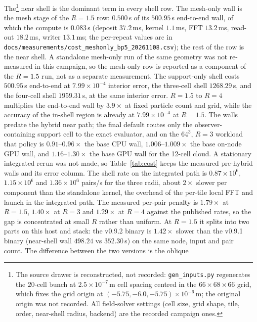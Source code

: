 The\footnote{The source drawer is reconstructed, not recorded:
\texorpdfstring{\texttt{gen\_inputs.py}}{gen\_inputs.py} regenerates the
$20$-cell bunch at $2.5\times10^{-7}$\,m cell spacing centred in the
$66\times68\times66$ grid, which fixes the grid origin at
$(-5.75,-6.0,-5.75)\times10^{-6}$\,m; the original origin was not recorded.
All field-solver settings (cell size, grid shape, tile, order,
near-shell radius, backend) are the recorded campaign ones.} near shell is
the dominant term in every shell row. The mesh-only wall is the mesh stage of
the $R=1.5$ row: $0.500$\,s of its $500.95$\,s end-to-end wall, of which the
compute is $0.083$\,s (deposit
$37.2$\,ms, kernel $1.1$\,ms, FFT $13.2$\,ms, read-out
$18.2$\,ms, writer $13.1$\,ms; the per-repeat values are in
\texttt{docs/measurements/cost\_meshonly\_bp5\_20261108.csv}); the rest of the
row is the near shell. A standalone mesh-only run of the same geometry was
not re-measured in this campaign, so the mesh-only row is reported as a
component of the $R=1.5$ run, not as a separate measurement.
The support-only shell
costs $500.95$\,s end-to-end at $7.99\times10^{-4}$ interior error, the
three-cell shell $1268.29$\,s, and the four-cell shell $1959.31$\,s, at the
same interior error. $R=1.5$ to $R=4$ multiplies the end-to-end wall by
$3.9\times$ at fixed particle count and grid, while the accuracy of the
in-shell region is already at $7.99\times10^{-4}$ at $R=1.5$. The walls
predate the hybrid near path; the final default routes only the
observer-containing support cell to the exact evaluator, and on the
$64^3$, $R=3$ workload that policy is $0.91$--$0.96\times$ the base CPU
wall, $1.006$--$1.009\times$ the base on-node GPU wall, and
$1.16$--$1.30\times$ the base GPU wall for the 12-cell cloud. A stationary
integrated rerun was not made, so Table~\ref{tab:cost} keeps the measured
pre-hybrid walls and its error column. The shell rate
on the integrated path is $0.87\times10^{6}$, $1.15\times10^{6}$ and
$1.36\times10^{6}$ pairs/s for the three radii, about $2\times$ slower per
component than the standalone kernel, the overhead of the per-tile local FFT
and launch in the integrated path. The measured per-pair penalty is
$1.79\times$ at $R=1.5$, $1.40\times$ at $R=3$ and $1.29\times$ at $R=4$
against the published rates, so the gap is concentrated at small
$R$ rather than uniform. At $R=1.5$ it splits into two parts on this
host and stack: the v0.9.2 binary is $1.42\times$ slower than the v0.9.1
binary (near-shell wall $498.24$ vs $352.30$\,s) on the same node, input
and pair count. The difference between the two versions is the oblique
